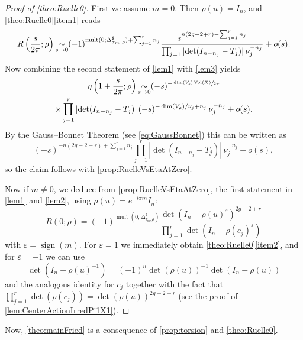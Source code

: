 \documentclass[10pt]{amsart}
\newcommand{\simm}{\mathop{\sim}\displaylimits}
\theoremstyle{plain}
\theoremstyle{definition}
\theoremstyle{remark}
\DeclareMathOperator{\Vol}{Vol}
\DeclareMathOperator{\sign}{sign}
\numberwithin{equation}{section}
\DeclareMathOperator{\mult}{mult}
\begin{document}
\begin{proof}[Proof of \cref{theo:Ruelle0}]
First we assume $m=0$. Then $\rho(u) = I_n$, and \cref{theo:Ruelle0}\eqref{item1} reads
\[
R\left(\frac s {2\pi}; \rho\right) \simm_{s\to 0} (-1)^{\mult(0;\Delta_{\tau_m,\rho}^\sharp)+\sum_{j=1}^r n_j}\frac{s^{n(2g-2+r) - \sum_{j=1}^r n_j}}{\prod_{j=1}^r|{\det} (I_{n-n_j} - T_j)|\,\nu_j^{-n_j}} + o(s).
\]
Now combining the second statement of \cref{lem1} with \cref{lem3} yields
\begin{multline*}
\eta\left(1+\frac s {2\pi};\rho\right) \simm_{s\to0} (-s)^{-\sfrac{\dim(V_\rho)\Vol(X)}{2\pi}}\\
\times\prod_{j=1}^r |{\det}(I_{n-n_j} -T_j)|\,(-s)^{-\dim(V_\rho)/\nu_j + n_j}\, \nu_j^{-n_j} + o(s).
\end{multline*}
By the Gauss--Bonnet Theorem (see \cref{eq:GaussBonnet}) this can be written as
\[
(-s)^{-n(2g-2+r)+\sum_{j=1}^rn_j}\prod_{j=1}^r |{\det}(I_{n-n_j} -T_j)|\, \nu_j^{-n_j} + o(s),
\]
so the claim follows with \cref{prop:RuelleVsEtaAtZero}.

Now if $m\neq 0$, we deduce from \cref{prop:RuelleVsEtaAtZero}, the first statement in \cref{lem1} and \cref{lem2}, using $\rho(u)= e^{-i\pi m} I_n$:
\[
R(0;\rho) = (-1)^{\mult(0;\Delta_{\tau_m,\rho}^\sharp)}\frac{\det(I_n-\rho(u)^\varepsilon)^{2g-2+r}}{\prod_{j=1}^r\det(I_n-\rho(c_j)^\varepsilon)}
\]
with $\varepsilon=\sign(m)$. For $\varepsilon=1$ we immediately obtain \cref{theo:Ruelle0}\eqref{item2}, and for $\varepsilon=-1$ we can use
\[
\det(I_n-\rho(u)^{-1})=(-1)^n\det(\rho(u))^{-1}\det(I_n-\rho(u))
\]
and the analogous identity for $c_j$ together with the fact that $\prod_{j=1}^r \det(\rho(c_j))=\det(\rho(u))^{2g-2+r}$ (see the proof of \cref{lem:CenterActionIrredPi1X1}).
\end{proof}

Now, \cref{theo:mainFried} is a consequence of \cref{prop:torsion} and \cref{theo:Ruelle0}.
\end{document}
